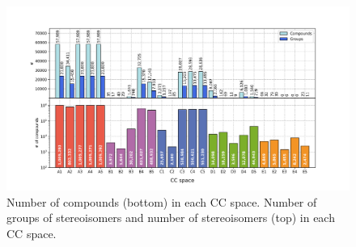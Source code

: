 \setcounter{section}{3} %
\setcounter{figure}{0}  %
\label{Stereoisomers_SupplementaryInformation}



\begin{figure}[htbp]
  \centering
  \includegraphics[width=1\linewidth]{figures/Stereoisomers/Supplementary/FigS1.png}
  \caption{Number of compounds (bottom) in each CC space. Number of groups of stereoisomers and number of stereoisomers (top) in each CC space.}
  \label{Stereoisomers_FigS1}
\end{figure}



